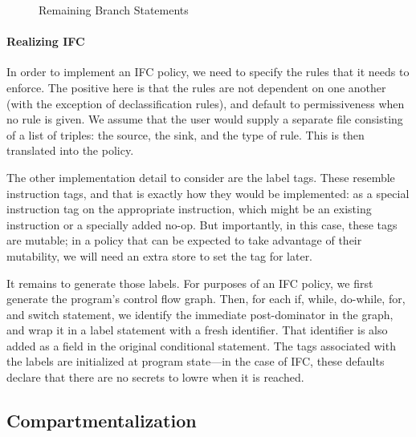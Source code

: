 \documentclass[acmsmall,review,anonymous]{acmart}\settopmatter{printfolios=true,printccs=false,printacmref=false}
\begin{document}
\begin{figure}
\begin{subfigure}{\textwidth}
  \end{subfigure}

  
  
  \caption{Remaining Branch Statements}
  \label{fig:rest}
\end{figure}

\paragraph*{Realizing IFC}

In order to implement an IFC policy, we need to specify the rules that it needs to enforce.
The positive here is that the rules are not dependent on one another (with the exception of
declassification rules), and default to permissiveness when no rule is given. We assume that
the user would supply a separate file consisting of a list of triples: the source, the sink,
and the type of rule. This is then translated into the policy.

The other implementation detail to consider are the label tags. These resemble
instruction tags, and that is exactly how they would be implemented: as a special instruction
tag on the appropriate instruction, which might be an existing instruction or a specially
added no-op. But importantly, in this case, these tags are mutable; in a policy that can be
expected to take advantage of their mutability, we will need an extra store to set the tag
for later.

It remains to generate those labels. For purposes of an IFC policy, we first generate the program's
control flow graph. Then, for each if, while, do-while, for, and switch statement, we identify the
immediate post-dominator in the graph, and wrap it in a label statement with a fresh identifier.
That identifier is also added as a field in the original conditional statement. The tags
associated with the labels are initialized at program state---in the case of IFC, these defaults
declare that there are no secrets to lowre when it is reached.

\subsection{Compartmentalization}
\label{sec:comp}
\end{document}
